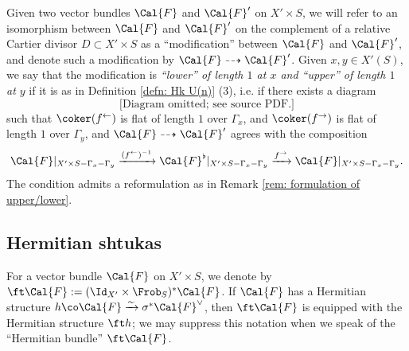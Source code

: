 \begin{defn}
\notready
Given two vector bundles $\Cal{F}$ and $\Cal{F}'$ on $X' \times S$, we will refer to an isomorphism between $\Cal{F}$ and $\Cal{F}'$ on the complement of a relative Cartier divisor $D\subset X'\times S$ %
as a ``modification'' between $\Cal{F}$ and $\Cal{F}'$, and denote such a modification by $\Cal{F} \dashrightarrow \Cal{F}'$. Given $x,y \in X'(S)$, we say that the modification is \emph{``lower'' of length $1$ at $x$ and ``upper'' of length $1$ at $y$} if it is as in Definition \ref{defn: Hk U(n)} (3), i.e. if there exists a diagram
\begin{equation}
\text{[Diagram omitted; see source PDF.]}
\end{equation}
such that $\coker(f^{\leftarrow})$ is flat of length $1$ over $\Gamma_{x}$, and $\coker(f^{\rightarrow})$ is flat of length $1$ over $\Gamma_{y}$, and $\Cal{F} \dashrightarrow \Cal{F}'$ agrees with the composition
\[
\Cal{F}|_{X' \times S - \Gamma_{x}-\Gamma_{y}} \xrightarrow{(f^{\leftarrow})^{-1}} \Cal{F}^{\flat}|_{X' \times S - \Gamma_x-\Gamma_y} \xrightarrow{f^{\rightarrow}} \Cal{F} |_{X' \times S - \Gamma_x-\Gamma_y} .
\]
The condition admits a reformulation as in Remark \ref{rem: formulation of upper/lower}.
\end{defn}

\subsection{Hermitian shtukas}
For a vector bundle $\Cal{F}$ on $X' \times S$, we denote by $\ft \Cal{F} := (\Id_{X'} \times \Frob_S)^* \Cal{F}$. If $\Cal{F}$ has a Hermitian structure $h \co \Cal{F} \xrightarrow{\sim} \sigma^* \Cal{F}^{\vee}$, then $\ft \Cal{F}$ is equipped with the Hermitian structure $\ft h$; we may suppress this notation when we speak of the ``Hermitian bundle'' $\ft \Cal{F}$.

